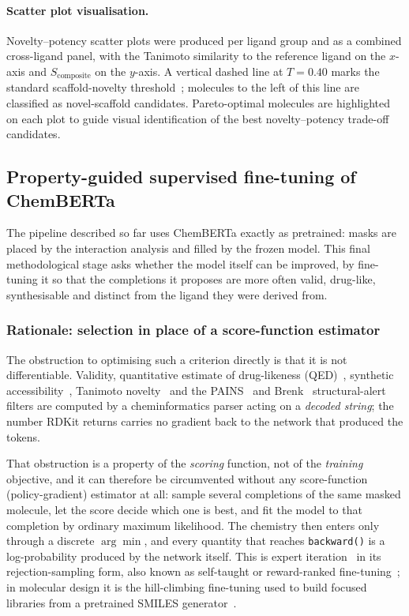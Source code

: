 \documentclass[a4paper,12pt]{article}
\begin{document}
\paragraph{Scatter plot visualisation.}
Novelty--potency scatter plots were produced per ligand group
and as a combined cross-ligand panel, with the Tanimoto
similarity to the reference ligand on the $x$-axis and
$S_{\mathrm{composite}}$ on the $y$-axis.
A vertical dashed line at $T = 0.40$ marks the standard
scaffold-novelty threshold~\cite{maggiora2014}; molecules
to the left of this line are classified as novel-scaffold
candidates.
Pareto-optimal molecules are highlighted on each plot
to guide visual identification of the best novelty--potency
trade-off candidates.

\subsection{Property-guided supervised fine-tuning of ChemBERTa}
\label{sec:stage10}

The pipeline described so far uses ChemBERTa exactly as pretrained: masks are
placed by the interaction analysis and filled by the frozen model. This final
methodological stage asks whether the model itself can be improved, by
fine-tuning it so that the completions it proposes are more often valid,
drug-like, synthesisable and distinct from the ligand they were derived from.

\subsubsection{Rationale: selection in place of a score-function estimator}

The obstruction to optimising such a criterion directly is that it is not
differentiable. Validity, quantitative estimate of drug-likeness
(QED)~\cite{bickerton2012qed}, synthetic accessibility~\cite{ertl2009sascore},
Tanimoto novelty~\cite{RogersHahn2010} and the PAINS~\cite{baell2010pains} and
Brenk~\cite{brenk2008alerts} structural-alert filters are computed by a
cheminformatics parser acting on a \emph{decoded string}; the number RDKit
returns carries no gradient back to the network that produced the tokens.

That obstruction is a property of the \emph{scoring} function, not of the
\emph{training} objective, and it can therefore be circumvented without any
score-function (policy-gradient) estimator at all: sample several completions of
the same masked molecule, let the score decide which one is best, and fit the
model to that completion by ordinary maximum likelihood. The chemistry then
enters only through a discrete $\arg\min$, and every quantity that reaches
\texttt{backward()} is a log-probability produced by the network itself. This is
expert iteration~\cite{anthony2017expert} in its rejection-sampling form, also
known as self-taught or reward-ranked
fine-tuning~\cite{zelikman2022star,dong2023raft}; in molecular design it is the
hill-climbing fine-tuning used to build focused libraries from a pretrained
SMILES generator~\cite{Segler2018,brown2019guacamol}.
\end{document}
